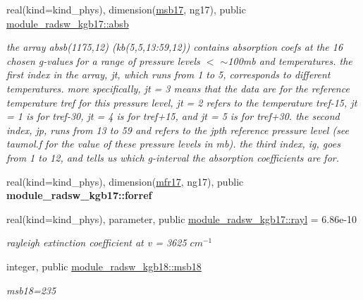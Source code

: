 \begin{DoxyCompactItemize}
real(kind=kind\+\_\+phys), dimension(\hyperlink{group__module__radsw__kgbnn_gafbb056103147b8e5f4d5a8af40420ea0}{msb17}, ng17), public \hyperlink{group__module__radsw__kgbnn_gaef407d13a88f5e1bfd20652ab3010e2f}{module\+\_\+radsw\+\_\+kgb17\+::absb}
\begin{DoxyCompactList}\small\item\em the array absb(1175,12) (kb(5,5,13\+:59,12)) contains absorption coefs at the 16 chosen g-\/values for a range of pressure levels $<$ $\sim$100mb and temperatures. the first index in the array, jt, which runs from 1 to 5, corresponds to different temperatures. more specifically, jt = 3 means that the data are for the reference temperature tref for this pressure level, jt = 2 refers to the temperature tref-\/15, jt = 1 is for tref-\/30, jt = 4 is for tref+15, and jt = 5 is for tref+30. the second index, jp, runs from 13 to 59 and refers to the jpth reference pressure level (see taumol.\+f for the value of these pressure levels in mb). the third index, ig, goes from 1 to 12, and tells us which g-\/interval the absorption coefficients are for. \end{DoxyCompactList}\item 
\mbox{\label{group__module__radsw__kgbnn_ga5041a137ba35dca9a767ce854748dd49}} 
real(kind=kind\+\_\+phys), dimension(\hyperlink{group__module__radsw__kgbnn_gadd099d7e1b5e7767d77de6d96673e26f}{mfr17}, ng17), public {\bfseries module\+\_\+radsw\+\_\+kgb17\+::forref}
\item 
\mbox{\label{group__module__radsw__kgbnn_gaa4862628a06e0e08d1db5637bc62ffa5}} 
real(kind=kind\+\_\+phys), parameter, public \hyperlink{group__module__radsw__kgbnn_gaa4862628a06e0e08d1db5637bc62ffa5}{module\+\_\+radsw\+\_\+kgb17\+::rayl} = 6.\+86e-\/10
\begin{DoxyCompactList}\small\item\em rayleigh extinction coefficient at v = 3625 $cm^{-1}$ \end{DoxyCompactList}\item 
\mbox{\label{group__module__radsw__kgbnn_gad2e52d9beb90328236a351926d1a3432}} 
integer, public \hyperlink{group__module__radsw__kgbnn_gad2e52d9beb90328236a351926d1a3432}{module\+\_\+radsw\+\_\+kgb18\+::msb18}
\begin{DoxyCompactList}\small\item\em msb18=235 \end{DoxyCompactList}\item 

\end{DoxyCompactItemize}
